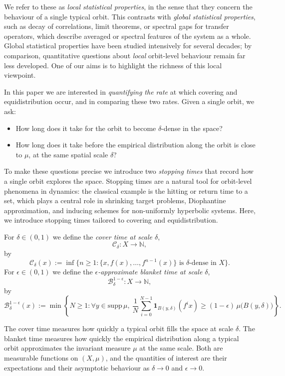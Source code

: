 \documentclass[11pt, reqno]{amsart}
\numberwithin{equation}{section}
\theoremstyle{plain}%
\theoremstyle{definition}
\def\B{\ensuremath{\mathcal B}}
\def\C{\ensuremath{\mathcal C}}
\renewcommand{\C}{\mathcal{C}}
\theoremstyle{nonumberplain}
\begin{document}
We refer to these as \emph{local statistical properties}, in the sense that they concern the behaviour of a single typical orbit. This contrasts with \emph{global statistical properties}, such as decay of correlations, limit theorems, or spectral gaps for transfer operators, which describe averaged or spectral features of the system as a whole. Global statistical properties have been studied intensively for several decades; by comparison, quantitative questions about \emph{local} orbit-level behaviour remain far less developed. One of our aims is to highlight the richness of this local viewpoint.

In this paper we are interested in \emph{quantifying the rate} at which covering and equidistribution occur, and in comparing these two rates. Given a single orbit, we ask:

\begin{itemize}
    \item How long does it take for the orbit to become $\delta$-dense in the space?
    \item How long does it take before the empirical distribution along the orbit is close to $\mu$, at the same spatial scale $\delta$?
\end{itemize}

To make these questions precise we introduce two \emph{stopping times} that record how a single orbit explores the space. Stopping times are a natural tool for orbit-level phenomena in dynamics: the classical example is the hitting or return time to a set, which plays a central role in shrinking target problems, Diophantine approximation, and inducing schemes for non-uniformly hyperbolic systems. Here, we introduce stopping times tailored to covering and equidistribution.

For $\delta \in (0,1)$ we define the \emph{cover time at scale $\delta$},
\[
  \C_\delta: X \to \mathbb{N},
\]
by
\[
  \C_\delta(x):=\inf\bigl\{n \ge 1: 
      \{x,f(x), \ldots , f^{n-1}(x)\} \text{ is $\delta$-dense in $X$}
  \bigr\}.
\]
For $\epsilon\in (0,1)$ we define the \emph{$\epsilon$-approximate blanket time at scale $\delta$},
\[
  \B_\delta^{1-\epsilon}: X \to \mathbb{N},
\]
by
\[
  \B_\delta^{1-\epsilon}(x):=\min\left\{N \ge 1: 
      \forall y \in \mathrm{supp}\,\mu,\ 
      \frac{1}{N} \sum_{i=0}^{N-1} 
        \mathbf{1}_{B(y,\delta)}(f^i x) 
      \geq (1-\epsilon)\,\mu\bigl(B(y,\delta)\bigr)
  \right\}.
\]

The cover time measures how quickly a typical orbit fills the space at scale $\delta$. The blanket time measures how quickly the empirical distribution along a typical orbit approximates the invariant measure $\mu$ at the same scale. Both are measurable functions on $(X,\mu)$, and the quantities of interest are their expectations and their asymptotic behaviour as $\delta\to0$ and $\epsilon\to0$.
\end{document}
